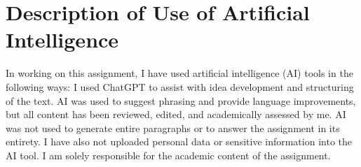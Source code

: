 \section*{Description of Use of Artificial Intelligence}

In working on this assignment, I have used artificial intelligence (AI) tools in the following ways: I used ChatGPT to assist with idea development and structuring of the text. AI was used to suggest phrasing and provide language improvements, but all content has been reviewed, edited, and academically assessed by me. AI was not used to generate entire paragraphs or to answer the assignment in its entirety. I have also not uploaded personal data or sensitive information into the AI tool. I am solely responsible for the academic content of the assignment.
